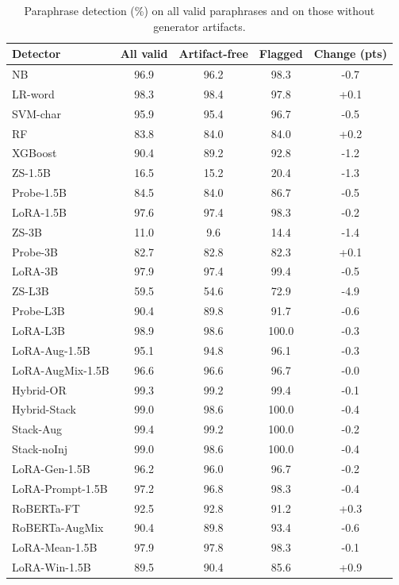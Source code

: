 \begin{table}[t]
\centering
\caption{Paraphrase detection (\%) on all valid paraphrases and on those without generator artifacts.}
\label{tab:paraclean}
\footnotesize
\begin{tabular}{lcccc}
\toprule
\textbf{Detector} & \textbf{All valid} & \textbf{Artifact-free} & \textbf{Flagged} & \textbf{Change (pts)} \\
\midrule
NB & 96.9 & 96.2 & 98.3 & -0.7 \\
LR-word & 98.3 & 98.4 & 97.8 & +0.1 \\
SVM-char & 95.9 & 95.4 & 96.7 & -0.5 \\
RF & 83.8 & 84.0 & 84.0 & +0.2 \\
XGBoost & 90.4 & 89.2 & 92.8 & -1.2 \\
ZS-1.5B & 16.5 & 15.2 & 20.4 & -1.3 \\
Probe-1.5B & 84.5 & 84.0 & 86.7 & -0.5 \\
LoRA-1.5B & 97.6 & 97.4 & 98.3 & -0.2 \\
ZS-3B & 11.0 & 9.6 & 14.4 & -1.4 \\
Probe-3B & 82.7 & 82.8 & 82.3 & +0.1 \\
LoRA-3B & 97.9 & 97.4 & 99.4 & -0.5 \\
ZS-L3B & 59.5 & 54.6 & 72.9 & -4.9 \\
Probe-L3B & 90.4 & 89.8 & 91.7 & -0.6 \\
LoRA-L3B & 98.9 & 98.6 & 100.0 & -0.3 \\
LoRA-Aug-1.5B & 95.1 & 94.8 & 96.1 & -0.3 \\
LoRA-AugMix-1.5B & 96.6 & 96.6 & 96.7 & -0.0 \\
Hybrid-OR & 99.3 & 99.2 & 99.4 & -0.1 \\
Hybrid-Stack & 99.0 & 98.6 & 100.0 & -0.4 \\
Stack-Aug & 99.4 & 99.2 & 100.0 & -0.2 \\
Stack-noInj & 99.0 & 98.6 & 100.0 & -0.4 \\
LoRA-Gen-1.5B & 96.2 & 96.0 & 96.7 & -0.2 \\
LoRA-Prompt-1.5B & 97.2 & 96.8 & 98.3 & -0.4 \\
RoBERTa-FT & 92.5 & 92.8 & 91.2 & +0.3 \\
RoBERTa-AugMix & 90.4 & 89.8 & 93.4 & -0.6 \\
LoRA-Mean-1.5B & 97.9 & 97.8 & 98.3 & -0.1 \\
LoRA-Win-1.5B & 89.5 & 90.4 & 85.6 & +0.9 \\
\bottomrule
\end{tabular}
\end{table}